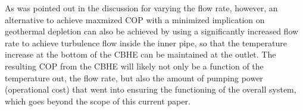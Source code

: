 	    As was pointed out in the discussion for varying the flow rate, however, an alternative to achieve maxmized COP with a minimized implication on geothermal depletion can also be achieved by using a significantly increased flow rate to achieve turbulence flow inside the inner pipe, so that the temperature increase at the bottom of the CBHE can be maintained at the outlet. The resulting COP from the CBHE will likely not only be a function of the temperature out, the flow rate, but also the amount of pumping power (operational cost) that went into ensuring the functioning of the overall system, which goes beyond the scope of this current paper. 
